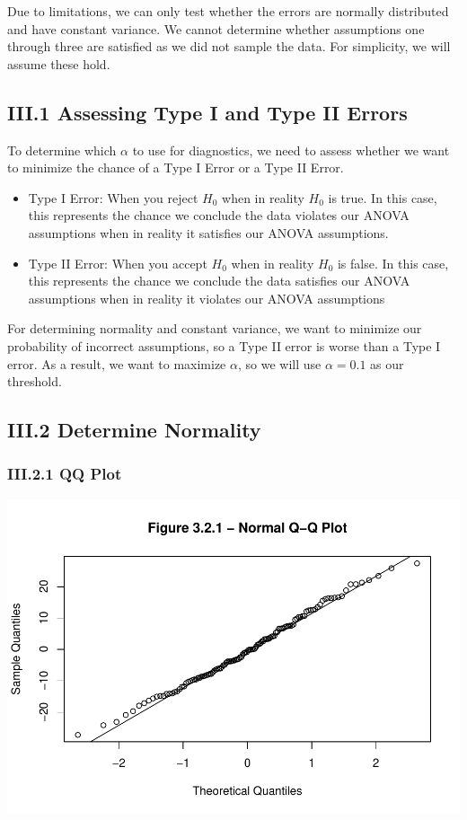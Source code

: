 \documentclass[
]{article}
\providecommand{\tightlist}{%
  \setlength{\itemsep}{0pt}\setlength{\parskip}{0pt}}
\begin{document}
Due to limitations, we can only test whether the errors are normally
distributed and have constant variance. We cannot determine whether
assumptions one through three are satisfied as we did not sample the
data. For simplicity, we will assume these hold.

\subsection{III.1 Assessing Type I and Type II
Errors}\label{iii.1-assessing-type-i-and-type-ii-errors}

To determine which \(\alpha\) to use for diagnostics, we need to assess
whether we want to minimize the chance of a Type I Error or a Type II
Error.

\begin{itemize}
\tightlist
\item
  Type I Error: When you reject \(H_0\) when in reality \(H_0\) is true.
  In this case, this represents the chance we conclude the data violates
  our ANOVA assumptions when in reality it satisfies our ANOVA
  assumptions.
\item
  Type II Error: When you accept \(H_0\) when in reality \(H_0\) is
  false. In this case, this represents the chance we conclude the data
  satisfies our ANOVA assumptions when in reality it violates our ANOVA
  assumptions
\end{itemize}

For determining normality and constant variance, we want to minimize our
probability of incorrect assumptions, so a Type II error is worse than a
Type I error. As a result, we want to maximize \(\alpha\), so we will
use \(\alpha = 0.1\) as our threshold.

\subsection{III.2 Determine Normality}\label{iii.2-determine-normality}

\subsubsection{III.2.1 QQ Plot}\label{iii.2.1-qq-plot}

\includegraphics{STA_106_Project_2_files/figure-latex/unnamed-chunk-4-1.pdf}
\end{document}

